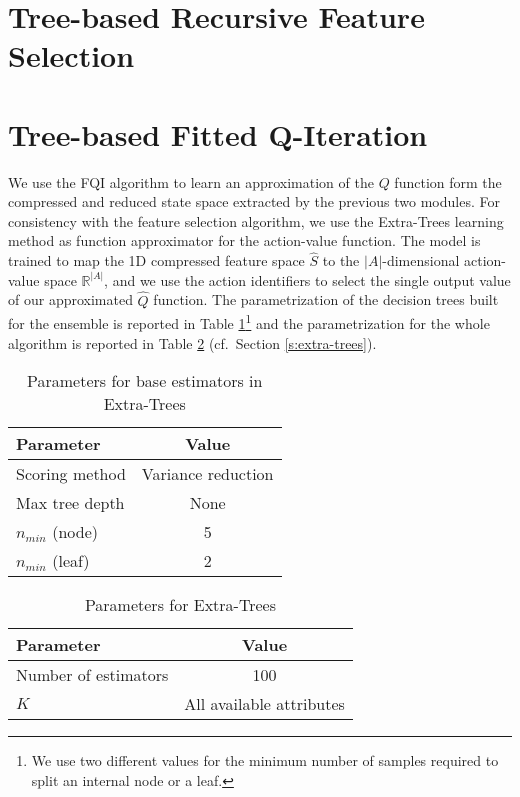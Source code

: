 
\section{Tree-based Recursive Feature Selection}

\section{Tree-based Fitted Q-Iteration}
We use the FQI algorithm to learn an approximation of the $Q$ function form the
compressed and reduced state space extracted by the previous two modules. 
For consistency with the feature selection algorithm, we use the Extra-Trees 
learning method as function approximator for the action-value function.
The model is trained to map the 1D compressed feature space $\hat{S}$ to the 
$|A|$-dimensional action-value space $\mathbb{R}^{|A|}$, and we use the action 
identifiers to select the single output value of our approximated $\hat{Q}$ 
function. 
The parametrization of the decision trees built for the ensemble is reported in
Table \ref{t:tree_params}\footnote{We use two different values for the minimum 
number of samples required to split an internal node or a leaf.} and the
parametrization for the whole algorithm is reported in Table 
\ref{t:extra_params} (cf.\ Section \ref{s:extra-trees}).

%
\begin{table}[h]	
    \centering
    \begin{tabular}{l c} 
	\hline
	Parameter & Value \\ 
	\hline 
	Scoring method &  Variance reduction \\
	Max tree depth & None \\
	$n_{min}$ (node) & 5\\
	$n_{min}$ (leaf) & 2 \\
	\hline
    \end{tabular}
    \caption{Parameters for base estimators in Extra-Trees}
    \label{t:tree_params}
\end{table}
%

%
\begin{table}[h]
    \centering
    \begin{tabular}{l c} 
	\hline
	Parameter & Value \\ 
	\hline 
	Number of estimators & 100 \\
	$K$ &  All available attributes \\
	\hline
    \end{tabular}
    \caption{Parameters for Extra-Trees}
    \label{t:extra_params}
\end{table}
%

